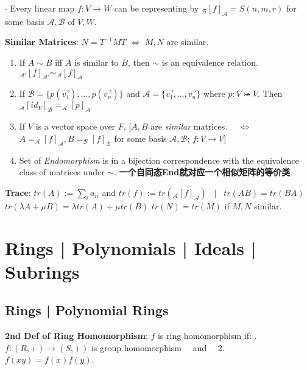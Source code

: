 \documentclass[9pt]{article}
\begin{document}
$\cdot$ Every linear map $f:V\to W$ can be representing by $_{\mathcal{B}}[f]_{\mathcal{A}}=S(n,m,r)$ for some basis $\mathcal{A},\mathcal{B}$ of $V,W$.

\textbf{Similar Matrices}: $N=T^{-1}MT$ $\Leftrightarrow$ $M,N$ are similar. 

\begin{enumerate}[itemsep=-2pt, topsep=-2pt]
    \item If $A\sim B$ iff $A$ is similar to $B$, then $\sim$ is an equivalence relation. \quad \quad $_{\mathcal{A}'}[f]_{\mathcal{A'}}\sim_{\mathcal{A}}[f]_{\mathcal{A}}$
    \item If $\mathcal{B}=\{p(\vec{v_1}),...,p(\vec{v_n})\}$ and $\mathcal{A}=\{\vec{v_1},...,\vec{v_n}\}$ where $p:V\bij V$. Then $_{\mathcal{A}}[id_V]_{\mathcal{B}}=_{\mathcal{A}}[p]_{\mathcal{A}}$
    \item If $V$ is a vector space over $F$, [$A,B$ are \textit{similar} matrices. \ \ $\Leftrightarrow$ \ \ $A=_{\mathcal{A}}[f]_{\mathcal{A}},B=_{\mathcal{B}}[f]_{\mathcal{B}}$ for some basis $\mathcal{A},\mathcal{B}$; $f:V\to V$]
    \item {\small Set of \textit{Endomorphism} is in a bijection correspondence with the equivalence class of matrices under $\sim$. } {\scriptsize \textbf{一个自同态End就对应一个相似矩阵的等价类}}
\end{enumerate}

\textbf{Trace}: $tr(A):=\sum_{i}a_{ii}$ and $tr(f):=tr(_{\mathcal{A}}[f]_{\mathcal{A}})$ \ $\big|$ \ {\small $tr(AB)=tr(BA)$ \quad $tr(\lambda A+\mu B)=\lambda tr(A)+\mu tr(B)$ \quad $tr(N)=tr(M)$ if $M,N$ similar.}


\section{Rings | Polynomials | Ideals | Subrings} %

\subsection{Rings | Polynomial Rings} %

\textbf{2nd Def of Ring Homomorphism}: {\small $f$ is ring homomorphism if: . $f:(R,+)\to (S,+)$ is group homomorphism \ \ and \ \ 2. $f(xy)=f(x)f(y)$.}
\end{document}
